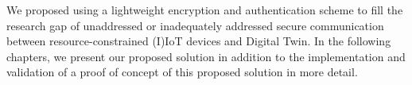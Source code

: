 We proposed using a lightweight encryption and authentication scheme to fill the research gap of unaddressed or inadequately addressed secure communication between resource-constrained (I)IoT devices and Digital Twin. In the following chapters, we present our proposed solution in addition to the implementation and validation of a proof of concept of this proposed solution in more detail. 


